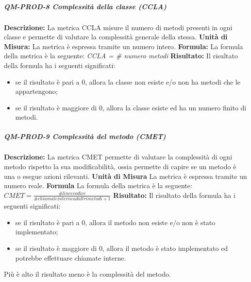 			\subparagraph{QM-PROD-8 Complessità della classe (CCLA)}
				\textbf{Descrizione: }
					La metrica CCLA misure il numero di metodi presenti in ogni classe e permette di valutare la complessità generale della stessa.
				\textbf{Unità di Misura: }
					La metrica è espressa tramite un numero intero.
				\textbf{Formula: }
					La formula della metrica è la seguente:
					\textit{CCLA = \# numero metodi}
				\textbf{Risultato: }
					Il risultato della formula ha i seguenti significati:
					\begin{itemize}
						\item se il risultato è pari a 0, allora la classe non esiste e/o non ha metodi che le appartengono;
						\item se il risultato è maggiore di 0, allora la classe esiste ed ha un numero finito di metodi.
					\end{itemize}
			\subparagraph{QM-PROD-9 Complessità del metodo (CMET)}
				\textbf{Descrizione: }
					La metrica CMET permette di valutare la complessità di ogni metodo rispetto la sua modificabilità, ossia permette di capire se un metodo è una  o esegue azioni rilevanti.
				\textbf{Unità di Misura}
					La metrica è espressa tramite un numero reale.
				\textbf{Formula}
					La formula della metrica è la seguente:
					\(
						CMET = \frac{\# linee codice}{\# chiamate interne ad altri metodi+1}
					\)
				\textbf{Risultato: }
					Il risultato della formula ha i seguenti significati:
					\begin{itemize}
						\item se il risultato è pari a 0, allora il metodo non esiste e/o non è stato implementato;
						\item se il risultato è maggiore di 0, allora il metodo è stato implementato ed potrebbe effettuare chiamate interne.
					\end{itemize}
					Più è alto il risultato meno è la complessità del metodo.					 
